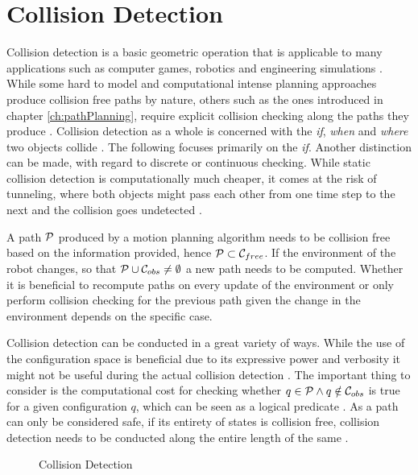 \chapter{Collision Detection}
Collision detection is a basic geometric operation that is applicable to many applications such as computer games, robotics and engineering simulations \cite{Ericson.2005} \cite{Ponamgi.1997} \cite{Chazelle.1987}. While some hard to model and computational intense planning approaches produce collision free paths by nature, others such as the ones introduced in chapter \ref{ch:pathPlanning}, require explicit collision checking along the paths they produce \cite{LaValle.2006}. Collision detection as a whole is concerned with the \emph{if}, \emph{when} and \emph{where} two objects collide \cite{Ericson.2005}. The following focuses primarily on the \emph{if}. Another distinction can be made, with regard to discrete or continuous checking. While static collision detection is computationally much cheaper, it comes at the risk of tunneling, where both objects might pass each other from one time step to the next and the collision goes undetected \cite{Ericson.2005}.

A path $\mathcal{P}$ produced by a motion planning algorithm needs to be collision free based on the information provided, hence $\mathcal{P} \subset \mathcal{C}_{free}$. If the environment of the robot changes, so that $\mathcal{P} \cup \mathcal{C}_{obs} \neq \emptyset$ a new path needs to be computed. Whether it is beneficial to recompute paths on every update of the environment or only perform collision checking for the previous path given the change in the environment depends on the specific case.

Collision detection can be conducted in a great variety of ways. While the use of the configuration space is beneficial due to its expressive power and verbosity it might not be useful during the actual collision detection \cite{LaValle.2006}. The important thing to consider is the computational cost for checking whether $q \in \mathcal{P} \land q \notin \mathcal{C}_{obs}$ is true for a given configuration $q$, which can be seen as a logical predicate \cite{LaValle.2006}. As a path can only be considered safe, if its entirety of states is collision free, collision detection needs to be conducted along the entire length of the same \cite{LaValle.2006} \cite{Ericson.2005}.

\begin{figure}[h]
    \caption{Collision Detection}
    \label{fig:collisionDetection}
\end{figure}

